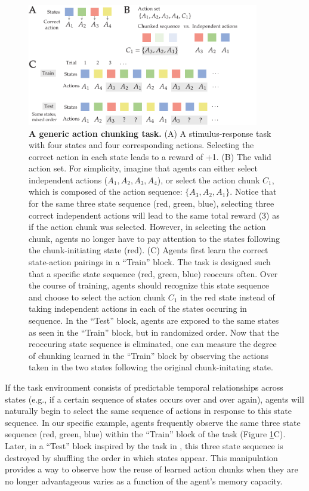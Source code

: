\documentclass[11pt]{article}
\begin{document}
\begin{figure}
    \centering
    \includegraphics[width=0.9\textwidth]{figs/ac1.pdf}
    \caption{\textbf{A generic action chunking task.} (A) A stimulus-response task with four states and four corresponding actions. Selecting the correct action in each state leads to a reward of +1. (B) The valid action set. For simplicity, imagine that agents can either select independent actions ($A_1, A_2, A_3, A_4$), or select the action chunk $C_1$, which is composed of the action sequence: $\{A_3,A_2,A_1\}$. Notice that for the same three state sequence (red, green, blue), selecting three correct independent actions will lead to the same total reward (3) as if the action chunk was selected. However, in selecting the action chunk, agents no longer have to pay attention to the states following the chunk-initiating state (red). (C) Agents first learn the correct state-action pairings in a ``Train'' block. The task is designed such that a specific state sequence (red, green, blue) reoccurs often. Over the course of training, agents should recognize this state sequence and choose to select the action chunk $C_1$ in the red state instead of taking independent actions in each of the states occuring in sequence. In the ``Test'' block, agents are exposed to the same states as seen in the ``Train'' block, but in randomized order. Now that the reoccuring state sequence is eliminated, one can measure the degree of chunking learned in the ``Train'' block by observing the actions taken in the two states following the original chunk-initating state.}
    \label{fig:ac1}
\end{figure}

If the task environment consists of predictable temporal relationships across states (e.g., if a certain sequence of states occurs over and over again), agents will naturally begin to select the same sequence of actions in response to this state sequence. In our specific example, agents frequently observe the same three state sequence (red, green, blue) within the ``Train'' block of the task (Figure \ref{fig:ac1}C). Later, in a ``Test'' block inspired by the task in \cite{sakai03}, this three state sequence is destroyed by shuffling the order in which states appear. This manipulation provides a way to observe how the reuse of learned action chunks when they are no longer advantageous varies as a function of the agent's memory capacity.
\end{document}
